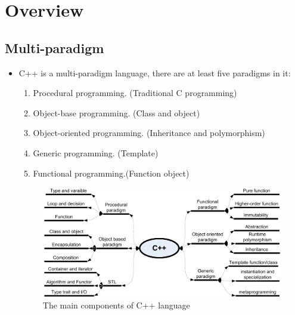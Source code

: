 \documentclass[a4paper,11pt,twoside]{book}
\begin{document}
\section{Overview}
\subsection{Multi-paradigm}
\begin{itemize}
	\item C++ is a multi-paradigm language, there are at least five paradigms in it: 
	\begin{enumerate}
		\item Procedural programming. (Traditional C programming)
		\item Object-base programming. (Class and object)
		\item Object-oriented programming. (Inheritance and polymorphism)
		\item Generic programming. (Template)
		\item Functional programming.(Function object)
	\end{enumerate}
	
	\begin{figure}[h]
		\centering
		\includegraphics[width=0.85\linewidth]{pics/whole.png}
		\caption{The main components of C++ language}
		\label{fig:whole}
	\end{figure}

\end{itemize}
\end{document}
